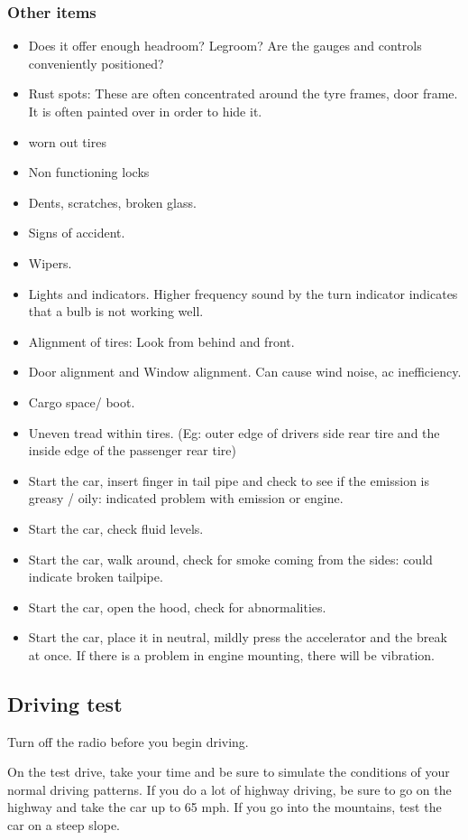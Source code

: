 \documentclass[oneside, article]{memoir}
\begin{document}
\subsubsection{Other items}
\begin{itemize}
\item Does it offer enough headroom? Legroom? Are the gauges and controls conveniently positioned?
\item Rust spots: These are often concentrated around the tyre frames, door frame. It is often painted over in order to hide it.
\item worn out tires
\item Non functioning locks
\item Dents, scratches, broken glass.
\item Signs of accident.
\item Wipers.
\item Lights and indicators. Higher frequency sound by the turn indicator indicates that a bulb is not working well.
\item Alignment of tires: Look from behind and front.
\item Door alignment and Window alignment. Can cause wind noise, ac inefficiency.
\item Cargo space/ boot.
\item Uneven tread within tires. (Eg: outer edge of drivers side rear tire and the inside edge of the passenger rear tire)
\item Start the car, insert finger in tail pipe and check to see if the emission is greasy / oily: indicated problem with emission or engine.
\item Start the car, check fluid levels.
\item Start the car, walk around, check for smoke coming from the sides: could indicate broken tailpipe.
\item Start the car, open the hood, check for abnormalities.
\item Start the car, place it in neutral, mildly press the accelerator and the break at once. If there is a problem in engine mounting, there will be vibration.
\end{itemize}

\subsection{Driving test}

Turn off the radio before you begin driving.

On the test drive, take your time and be sure to simulate the conditions of your normal driving patterns. If you do a lot of highway driving, be sure to go on the highway and take the car up to 65 mph. If you go into the mountains, test the car on a steep slope.
\end{document}
